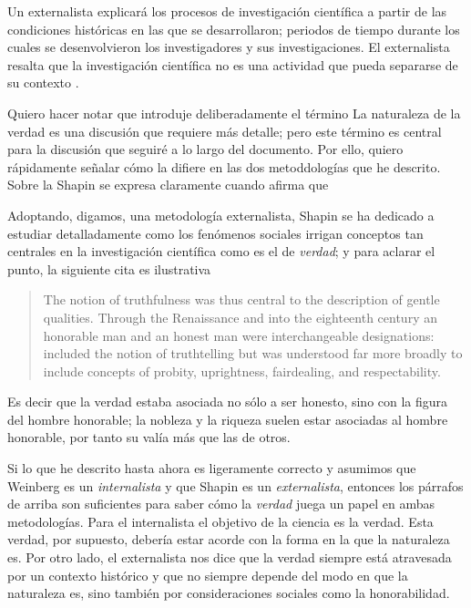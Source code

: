 Un externalista explicará los procesos de investigación
científica a partir de las condiciones históricas en las que se desarrollaron;
periodos de tiempo durante los cuales se desenvolvieron los investigadores
y sus investigaciones. 
El externalista resalta que la investigación
científica no es una actividad que pueda separarse de su contexto
.

Quiero hacer notar que introduje deliberadamente el término 
La naturaleza de la verdad es una discusión que requiere más detalle; pero este término es central para la discusión que seguiré a lo largo del documento.
Por ello, quiero rápidamente señalar cómo la  difiere en las dos metoddologías que he descrito.
Sobre la  Shapin se expresa claramente cuando afirma que  \parencite[Capítulo 2]{shapin2010never}

Adoptando, digamos, una metodología externalista, Shapin se ha dedicado a estudiar detalladamente como los fenómenos sociales irrigan conceptos tan centrales en la investigación científica como es el de \emph{verdad}; y para aclarar el punto, la siguiente cita es ilustrativa

\begin{quote}
	The notion of truthfulness was thus central to the description of gentle qualities.
	Through the Renaissance and into the eighteenth century an honorable man and an honest man were interchangeable designations:  included the notion of truthtelling but was understood far more broadly to include concepts of probity, uprightness, fairdealing, and respectability. \parencite[pp. 70-71]{Shapin1995}
\end{quote}

Es decir que la verdad estaba asociada no sólo a ser honesto, sino con la figura del hombre honorable; la nobleza y la riqueza suelen estar asociadas al hombre honorable, por tanto su  valía más que las de otros.

Si lo que he descrito hasta ahora es ligeramente correcto y asumimos que Weinberg es un \emph{internalista} y que Shapin es un \emph{externalista}, entonces los párrafos de arriba son suficientes para saber cómo la \emph{verdad} juega un papel en ambas metodologías.
Para el internalista el objetivo de la ciencia es la verdad.
Esta verdad, por supuesto, debería estar acorde con la forma en la que la naturaleza es.
Por otro lado, el externalista nos dice que la verdad siempre está
atravesada por un contexto histórico y que no siempre depende del modo en
que la naturaleza es, sino también por consideraciones sociales como la
honorabilidad. 

